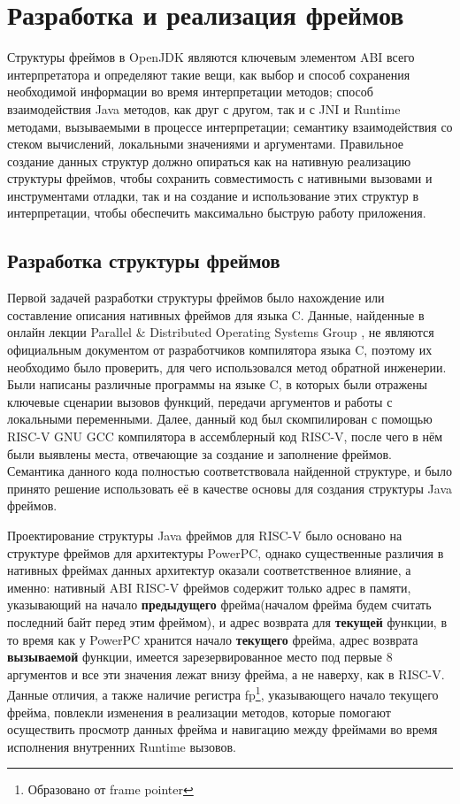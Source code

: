 \section{Разработка и реализация фреймов}

Структуры фреймов в OpenJDK являются ключевым элементом ABI всего интерпретатора и определяют такие вещи, как выбор и способ сохранения необходимой информации во время интерпретации методов; способ взаимодействия Java методов, как друг с другом, так и с JNI и Runtime методами, вызываемыми в процессе интерпретации; семантику взаимодействия со стеком вычислений, локальными значениями и аргументами. Правильное создание данных структур должно опираться как на нативную реализацию структуры фреймов, чтобы сохранить совместимость с нативными вызовами и инструментами отладки, так и на создание и использование этих структур в интерпретации, чтобы обеспечить максимально быструю работу приложения.


\subsection{Разработка структуры фреймов}

Первой задачей разработки структуры фреймов было нахождение или составление описания нативных фреймов для языка C. Данные, найденные в онлайн лекции Parallel \& Distributed Operating Systems Group \cite{lecture:frames}, не являются официальным документом от разработчиков компилятора языка C, поэтому их необходимо было проверить, для чего использовался метод обратной инженерии. Были написаны различные программы на языке C, в которых были отражены ключевые сценарии вызовов функций, передачи аргументов и работы с локальными переменными. Далее, данный код был скомпилирован с помощью RISC-V GNU GCC \cite{riscv:gnu} компилятора в ассемблерный код RISC-V, после чего в нём были выявлены места, отвечающие за создание и заполнение фреймов. Семантика данного кода полностью соответствовала найденной структуре, и было принято решение использовать её в качестве основы для создания структуры Java фреймов. 

Проектирование структуры Java фреймов для RISC-V было основано на структуре фреймов для архитектуры PowerPC, однако существенные различия в нативных фреймах данных архитектур оказали соответственное влияние, а именно: нативный ABI RISC-V фреймов содержит только адрес в памяти, указывающий на начало \textbf{предыдущего} фрейма(началом фрейма будем считать последний байт перед этим фреймом), и адрес возврата для \textbf{текущей} функции, в то время как у PowerPC хранится начало \textbf{текущего} фрейма, адрес возврата \textbf{вызываемой} функции, имеется зарезервированное место под первые 8 аргументов и все эти значения лежат внизу фрейма, а не наверху, как в RISC-V.
Данные отличия, а также наличие регистра fp\footnote{Образовано от frame pointer}, указывающего начало текущего фрейма, повлекли изменения в реализации методов, которые помогают осуществить просмотр данных фрейма и навигацию между фреймами во время исполнения внутренних Runtime вызовов.

